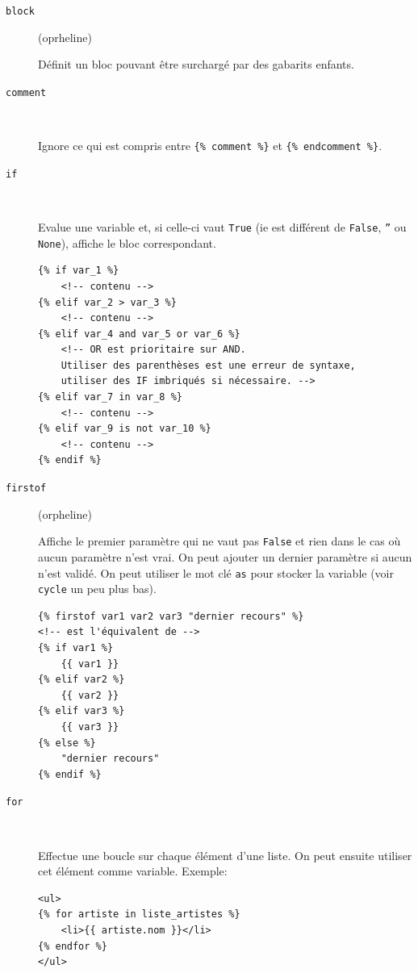\documentclass[a4paper, 10pt]{article}
\begin{document}
\begin{description}
    \item[\texttt{block}] (oprheline)

    Définit un bloc pouvant être surchargé par des gabarits enfants.

    \item[\texttt{comment}]~

    Ignore ce qui est compris entre \texttt{\{\% comment \%\}} et \texttt{\{\% endcomment \%\}}.

    \item[\texttt{if}]~

    Evalue une variable et, si celle-ci vaut \texttt{True} (ie est différent de \texttt{False}, \texttt{''} ou \texttt{None}), affiche le bloc correspondant.

    \begin{verbatim}
{% if var_1 %}
    <!-- contenu -->
{% elif var_2 > var_3 %}
    <!-- contenu -->
{% elif var_4 and var_5 or var_6 %}
    <!-- OR est prioritaire sur AND.
    Utiliser des parenthèses est une erreur de syntaxe,
    utiliser des IF imbriqués si nécessaire. -->
{% elif var_7 in var_8 %}
    <!-- contenu -->
{% elif var_9 is not var_10 %}
    <!-- contenu -->
{% endif %}
    \end{verbatim}

    \item[\texttt{firstof}] (orpheline)

    Affiche le premier paramètre qui ne vaut pas \texttt{False} et rien dans le cas où aucun paramètre n'est vrai. On peut ajouter un dernier paramètre si aucun n'est validé. On peut utiliser le mot clé \texttt{as} pour stocker la variable (voir \texttt{cycle} un peu plus bas).

    \begin{verbatim}
{% firstof var1 var2 var3 "dernier recours" %}
<!-- est l'équivalent de -->
{% if var1 %}
    {{ var1 }}
{% elif var2 %}
    {{ var2 }}
{% elif var3 %}
    {{ var3 }}
{% else %}
    "dernier recours"
{% endif %}
    \end{verbatim}

    \item[\texttt{for}]~

    Effectue une boucle sur chaque élément d'une liste. On peut ensuite utiliser cet élément comme variable. Exemple:
    \begin{verbatim}
<ul>
{% for artiste in liste_artistes %}
    <li>{{ artiste.nom }}</li>
{% endfor %}
</ul>
    \end{verbatim}


\end{description}
\end{document}
